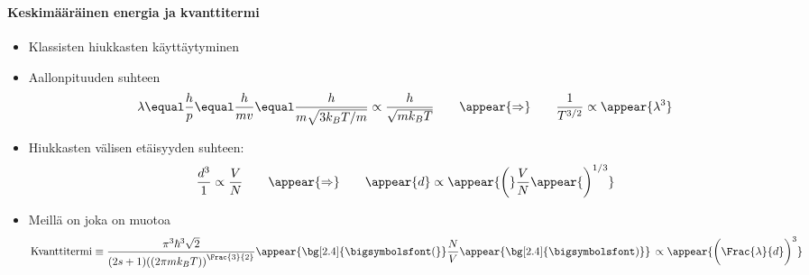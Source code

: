 \begin{frame}
\frametitle{\texorpdfstring{\culine[\sectiontitleulinecolor]{\sectiontitle}}{\sectiontitle} }
\framesubtitle{Keskimääräinen energia ja kvanttitermi}
\appear{}
\begin{itemize} \seminormal
	\item Klassisten hiukkasten käyttäytyminen \appear{$\leftrightarrow$} 
\appear{$\leftrightarrow$}  

\item Aallonpituuden suhteen 
\[
\lambda  \equal \frac{h}{p}  \equal \frac{h}{m v}  \equal \frac{h}{m \sqrt{3 k_{B} T / m}} \propto \frac{h}{\sqrt{m k_{B} T}} \qquad \appear{\Rightarrow} \qquad \frac{1}{T^{3 / 2}} \propto \appear{\lambda^{3}}
\]
\item Hiukkasten välisen etäisyyden suhteen:
\[
\frac{d^{3}}{1} \propto \frac{V}{N} \qquad \appear{\Rightarrow} \qquad \appear{d} \propto \appear{\bigg(} \frac{V}{N} \appear{\bigg)^{1 / 3}}
\]

\item Meillä on  joka on muotoa
\[
\text {Kvanttitermi}  \equiv \frac{\pi^{3} \hbar^{3} \sqrt{2}}{(2 s+1) \textrm{((}2 \pi m k_{B} T \textrm{))}^{\Frac{3}{2}}} \appear{\bg[2.4]{\text{\bigsymbolsfont(}}} \frac{N}{V} \appear{\bg[2.4]{\text{\bigsymbolsfont)}}}  \,\propto \appear{ \bigg( \Frac{\lambda}{d} \bigg)^{3}}
\]
\end{itemize}

\endofslide 
\end{frame}


